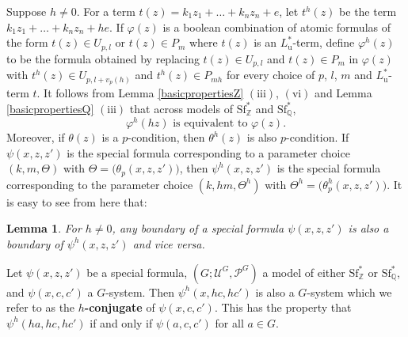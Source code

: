 \documentclass[letterpaper]{amsart}
\newcommand{\qq}{\mathbb{Q}}
\newcommand{\zz}{\mathbb{Z}}
\newcommand{\sU}{\mathscr{U}}
\newcommand{\sP}{\mathscr{P}}
\newcommand{\WSFZ}{\mathrm{Sf}^*_{\zz}}
\newcommand{\WSFQ}{\mathrm{Sf}^*_{\qq}}
\newtheorem{lem}[thm]{Lemma}
\begin{document}
\medskip \noindent Suppose $h\neq 0$. For a term $t(z) = k_1 z_1+ \ldots +k_n z_n +e$, let $t^h(z)$ be the term $k_1z_1+ \ldots+k_nz_n+ he$.  If $\varphi(z)$ is  a boolean combination of atomic formulas of the form $t(z) \in U_{p,l}$ or $t(z) \in P_{m}$ where $t(z)$ is an $L_\mathrm{u}^*$-term, define $\varphi^h(z)$ to be the formula obtained by replacing $t(z) \in U_{p,l}$ and $t(z) \in P_{m}$ in $\varphi(z)$ with $t^h(z) \in U_{p,l+v_p(h)}$ and $t^h(z) \in P_{mh}$ for every choice of  $p$, $l$, $m$ and $L_\mathrm{u}^*$-term $t$. It follows from Lemma \ref{basicpropertiesZ} $\mathrm{(iii)}$, $\mathrm{(vi)}$ and Lemma \ref{basicpropertiesQ} $\mathrm{(iii)}$ that across models of $\WSFZ$ and $\WSFQ$,
 $$\varphi^h(hz) \text{ is equivalent to } \varphi(z). $$
Moreover, if $\theta(z)$ is a $p$-condition, then  $\theta^h(z)$ is also  $p$-condition. If $\psi(x,z, z')$ is the special formula corresponding to a parameter choice $(k, m, \Theta)$ with $\Theta = \big(\theta_p(x,z,z')\big)$, then $\psi^h(x,z, z')$ is the special formula  corresponding to the parameter choice  $(k, hm, \Theta^h)$ with $\Theta^h = \big(\theta_p^h(x,z,z')\big)$. It is easy to see from here that:


\begin{lem}\label{BoundaryRobust}
For $h \neq 0$, any boundary of a special formula $\psi(x,z,z')$ is also a boundary of $\psi^h(x,z,z')$ and vice versa.
\end{lem}
\noindent Let $\psi(x, z, z')$ be a special formula, $(G; \sU^G,\sP^G)$ a model of either $\WSFZ$ or $\WSFQ$, and $\psi(x, c, c')$ a $G$-system. Then $\psi^h(x, hc, hc')$ is also a $G$-system which we refer to as the {\bf $h$-conjugate} of $\psi(x, c, c')$. This has the property that $\psi^h(ha,hc,hc')$ if and only if $\psi(a,c,c')$ for all $a \in G$.
\end{document}
